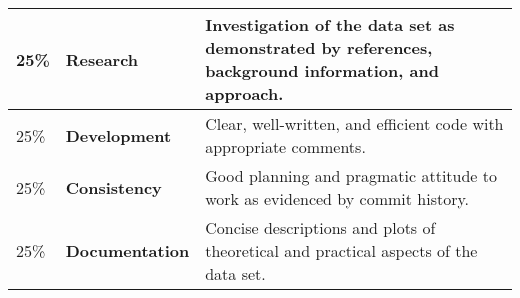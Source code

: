 \documentclass[12pt, a4paper, hidelinks]{scrartcl}
\begin{document}
  \begin{center}
    \begin{tabular}{llp{8.4cm}}
      \toprule
      25\% & \textbf{Research} & Investigation of the data set as demonstrated by references, background information, and approach. \\
      \midrule
      25\% & \textbf{Development} & Clear, well-written, and efficient code with appropriate comments. \\
      \midrule
      25\% & \textbf{Consistency} & Good planning and pragmatic attitude to work as evidenced by commit history. \\
      \midrule
      25\% & \textbf{Documentation} & Concise descriptions and plots of theoretical and practical aspects of the data set. \\
      \bottomrule
    \end{tabular}
  \end{center}
\end{document}
